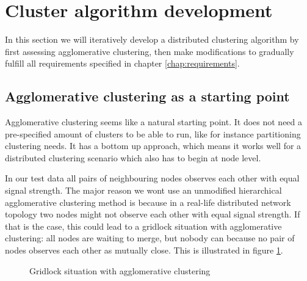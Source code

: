 \section{Cluster algorithm development}
In this section we will iteratively develop a distributed clustering algorithm by first assessing agglomerative clustering, then make modifications to 
gradually fulfill all requirements specified in chapter \ref{chap:requirements}.

\subsection{Agglomerative clustering as a starting point}
Agglomerative clustering seems like a natural starting point. It does not need a pre-specified amount of clusters to be able to run,
like for instance partitioning clustering needs. It has a bottom up approach, which means it works well for a distributed clustering scenario which also has to begin
at node level. 

In our test data all pairs of neighbouring nodes observes each other with equal signal strength. The major reason we wont use an unmodified hierarchical agglomerative clustering method is because in a real-life distributed network topology two nodes might not observe
each other with equal signal strength. If that is the case, this could lead to a gridlock situation with agglomerative clustering: all nodes are waiting to merge, but nobody can because no pair 
of nodes observes each other as mutually close. This is illustrated in figure \ref{fig:gridlock}. 

\begin{figure}
	\centering
	\caption{Gridlock situation with agglomerative clustering}
	\label{fig:gridlock}
\end{figure}

